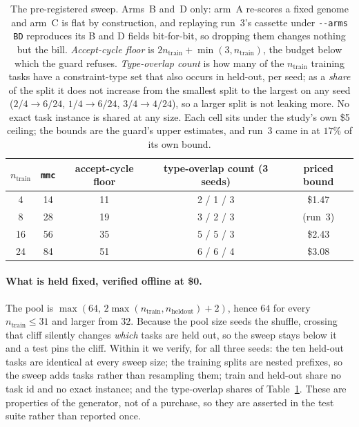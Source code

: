 \documentclass[11pt]{article}
\begin{document}
\begin{table}[h]
\centering
\begin{tabular}{ccccc}
\toprule
$n_{\mathrm{train}}$ & \texttt{mmc} & accept-cycle floor & type-overlap count (3 seeds) & priced bound \\
\midrule
4  & 14 & 11 & 2 / 1 / 3 & \$1.47 \\
8  & 28 & 19 & 3 / 2 / 3 & (run~3) \\
16 & 56 & 35 & 5 / 5 / 3 & \$2.43 \\
24 & 84 & 51 & 6 / 6 / 4 & \$3.08 \\
\bottomrule
\end{tabular}
\caption{The pre-registered sweep. Arms~B and~D only: arm~A re-scores a fixed genome and
arm~C is flat by construction, and replaying run~3's cassette under \texttt{-{}-arms BD}
reproduces its B and D fields bit-for-bit, so dropping them changes nothing but the bill.
\emph{Accept-cycle floor} is $2n_{\mathrm{train}} + \min(3, n_{\mathrm{train}})$, the budget
below which the guard refuses. \emph{Type-overlap count} is how many of the
$n_{\mathrm{train}}$ training tasks have a constraint-type set that also occurs in held-out,
per seed; as a \emph{share} of the split it does not increase from the smallest split to the
largest on any seed ($2/4 \to 6/24$, $1/4 \to 6/24$, $3/4 \to 4/24$), so a larger split is not
leaking more. No exact task instance is shared at any size. Each cell
sits under the study's own \$5 ceiling; the bounds are the guard's upper estimates, and run~3
came in at $17\%$ of its own bound.}
\label{tab:splitsweep}
\end{table}

\paragraph{What is held fixed, verified offline at \$0.} The pool is
$\max(64,\,2\max(n_{\mathrm{train}}, n_{\mathrm{heldout}}) + 2)$, hence $64$ for every
$n_{\mathrm{train}} \le 31$ and larger from $32$. Because the pool size seeds the shuffle,
crossing that cliff silently changes \emph{which} tasks are held out, so the sweep stays below
it and a test pins the cliff. Within it we verify, for all three seeds: the ten held-out tasks
are identical at every sweep size; the training splits are nested prefixes, so the sweep adds
tasks rather than resampling them; train and held-out share no task id and no exact instance;
and the type-overlap shares of Table~\ref{tab:splitsweep}. These are properties of the
generator, not of a purchase, so they are asserted in the test suite rather than reported once.
\end{document}

